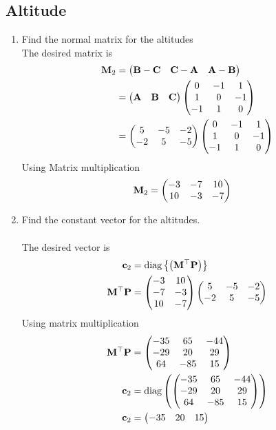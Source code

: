 \documentclass[10pt]{book}
\begin{document}
\subsection{Altitude}
\begin{enumerate}[label=\thesubsection.\arabic*.,ref=\thesubsection.\theenumi]
\item Find the normal matrix for the altitudes \\
\solution  The desired matrix is 
\begin{align}
\mathbf{M}_2 &= \begin{pmatrix}\mathbf{B}-\mathbf{C} & \mathbf{C}-\mathbf{A} & \mathbf{A}-\mathbf{B} \end{pmatrix}
\\
&= 
\begin{pmatrix}\mathbf{A} & \mathbf{B} &\mathbf{C}\end{pmatrix}
\begin{pmatrix} 0 & -1 & 1 \\ 1 & 0 & -1 \\ -1 & 1 & 0\end{pmatrix} \\
&= 
\begin{pmatrix}5 & -5 & -2 \\ -2 & 5 & -5\end{pmatrix}
\begin{pmatrix} 0 & -1 & 1 \\ 1 & 0 & -1 \\ -1 & 1 & 0\end{pmatrix}
\end{align}
Using Matrix multiplication 
\begin{align}
   \mathbf{M}_2 &=\begin{pmatrix}-3 & -7 & 10 \\ 10 & -3 & -7\end{pmatrix}
\end{align}
\item Find the constant vector for the altitudes. \\
\solution\\
The desired vector is 
\begin{align}
\mathbf{c}_2 &= \text{diag}\left\{\left(\mathbf{M}^{\top}\mathbf{P}\right)\right\} \\
\mathbf{M}^{\top}\mathbf{P} &= \begin{pmatrix}-3&10 \\ -7&-3 \\ 10 &-7\end{pmatrix}\begin{pmatrix}5 & -5 & -2 \\ -2 & 5 & -5\end{pmatrix} \\
\end{align}
Using matrix multiplication
\begin{align}
 \mathbf{M}^{\top}\mathbf{P}    &=\begin{pmatrix} -35 & 65 & -44 \\ -29 & 20 & 29 \\ 64 & -85 & 15 \end{pmatrix} \\
    \mathbf{c}_2 &= \text{diag}\left( \begin{pmatrix} -35 & 65 & -44 \\ -29 & 20 & 29 \\ 64 & -85 & 15 \end{pmatrix} \right) \\
 \mathbf{c}_2   &= \begin{pmatrix} -35 & 20 & 15\end{pmatrix}
\end{align}
\end{enumerate}
\end{document}
